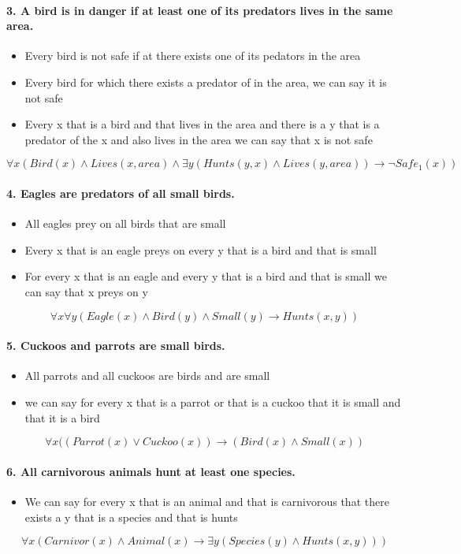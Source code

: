 \documentclass[11pt,a4paper]{article}
\newenvironment{solution}{%
	\begin{tcolorbox}[
		breakable,
		colback=green!4,
		colframe=green!50!black,
		fonttitle=\bfseries,
		title={ Solution},
		left=6pt, right=6pt, top=4pt, bottom=4pt
		]%
	}{%
	\end{tcolorbox}%
}
\begin{document}
\begin{solution}
\paragraph{3. A bird is in danger if at least one of its predators lives in the same area.}
\begin{itemize}
    \item Every bird is not safe if at there exists one of its pedators in the area
    \item Every bird for which there exists a predator of in the area, we can say it is not safe
    \item Every x that is a bird and that lives in the area and there is a y that is a predator of the x and also lives in the area we can say that x is not safe 
\end{itemize}
\[
\forall x (
    Bird(x) \land
    Lives(x, area) \land 
    \exists y (
        Hunts(y,x) \land 
        Lives(y,area) 
    )
    \rightarrow \neg Safe_1(x)
)
\]

\paragraph{4. Eagles are predators of all small birds.}
\begin{itemize}
    \item All eagles prey on all birds that are small
    \item Every x that is an eagle preys on every y that is a bird and that is small 
    \item For every x that is an eagle and every y that is a bird and that is small we can say that x preys on y
\end{itemize}
\[
\forall x \forall y(
    Eagle(x) \land
    Bird(y) \land
    Small(y)
    \rightarrow
    Hunts(x,y)
)
\]


\paragraph{5. Cuckoos and parrots are small birds.}
\begin{itemize}
    \item All parrots and all cuckoos are birds and are small
    \item we can say for every x that is a parrot or that is a cuckoo that it is small and that it is a bird 
\end{itemize}
\[
\forall x ( (Parrot(x) \lor Cuckoo(x)) \rightarrow (Bird(x) \land Small(x))
\]


\paragraph{6. All carnivorous animals hunt at least one species.}
\begin{itemize}
    \item We can say for every x that is an animal and that is carnivorous that there exists a y that is a species and that is hunts 
\end{itemize}
\[
\forall x (
    Carnivor(x) \land Animal(x) \rightarrow
    \exists y(
        Species(y) \land Hunts(x,y)
    )
)
\]
\end{solution}
\end{document}
